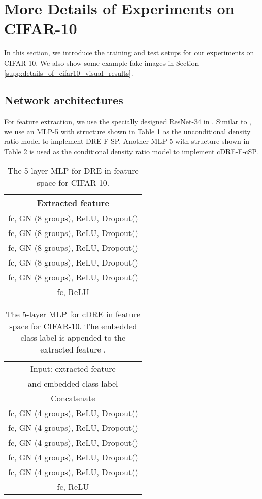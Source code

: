 \documentclass[10pt, twocolumn]{article}
\theoremstyle{definition}
\begin{document}
\section{More Details of Experiments on CIFAR-10}\label{supp:details_of_cifar10}

In this section, we introduce the training and test setups for our experiments on CIFAR-10. We also show some example fake images in Section \ref{supp:details_of_cifar10_visual_results}.

\subsection{Network architectures} \label{supp:net_arch_of_cifar10_exp}

For feature extraction, we use the specially designed ResNet-34 in \cite{ding2020subsampling}. Similar to \cite{ding2020subsampling}, we use an MLP-5 with structure shown in Table \ref{tab:cifar10_MLP5} as the unconditional density ratio model to implement DRE-F-SP. Another MLP-5 with structure shown in Table \ref{tab:cifar10_cMLP5} is used as the conditional density ratio model to implement cDRE-F-cSP. 


\begin{table}[!htbp]
	\centering
	\caption{The 5-layer MLP for DRE in feature space for CIFAR-10.}
	\begin{tabular}{c}
		\toprule
		Extracted feature  \\
		\hline
		fc, GN (8 groups), ReLU, Dropout() \\\hline
		fc, GN (8 groups), ReLU, Dropout() \\\hline
		fc, GN (8 groups), ReLU, Dropout() \\\hline
		fc, GN (8 groups), ReLU, Dropout() \\\hline
		fc, GN (8 groups), ReLU, Dropout() \\\hline
		fc, ReLU \\
		\bottomrule
	\end{tabular}\label{tab:cifar10_MLP5}\end{table}

\begin{table}[!htbp]
	\centering
	\caption{The 5-layer MLP for cDRE in feature space for CIFAR-10. The embedded class label is appended to the extracted feature .}
	\begin{tabular}{c}
		\toprule
		Input: extracted feature  \\
		and embedded class label  \\
		\hline
		Concatenate \\
		\hline
		fc, GN (4 groups), ReLU, Dropout() \\\hline
		fc, GN (4 groups), ReLU, Dropout() \\\hline
		fc, GN (4 groups), ReLU, Dropout() \\\hline
		fc, GN (4 groups), ReLU, Dropout() \\\hline
		fc, GN (4 groups), ReLU, Dropout() \\\hline
		fc, ReLU \\
		\bottomrule
	\end{tabular}\label{tab:cifar10_cMLP5}\end{table}
\end{document}
